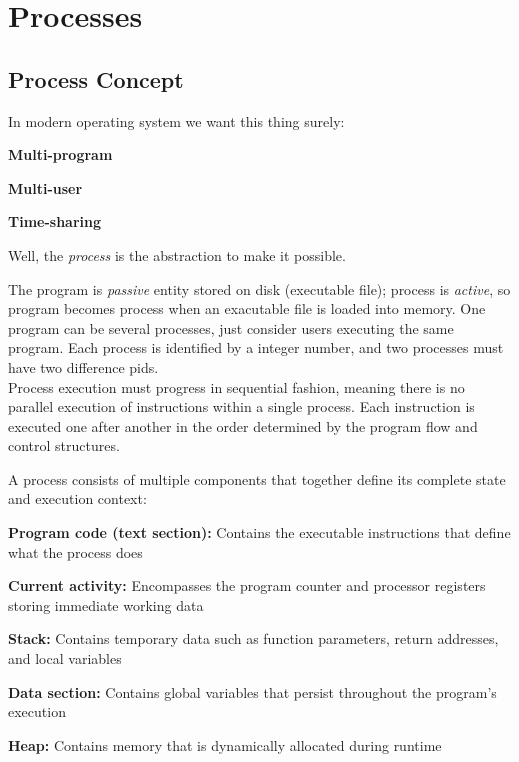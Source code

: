 \chapter{Processes}

\section{Process Concept}

    In modern operating system we want this thing surely:
    \begin{compactitemize}
        \item \textbf{Multi-program}
        \item \textbf{Multi-user}
        \item \textbf{Time-sharing}
    \end{compactitemize}
    Well, the \emph{process} is the abstraction to make it possible.
    
    The program is \emph{passive} entity stored on disk (executable file); process is \emph{active}, so program becomes process when an exacutable file is loaded into memory. One program can be several processes, just consider users executing the same program.
    Each process is identified by a integer number, and two processes must have two difference pids.\\
    
    Process execution must progress in sequential fashion, meaning there is no parallel execution of instructions within a single process. Each instruction is executed one after another in the order determined by the program flow and control structures.
    
    A process consists of multiple components that together define its complete state and execution context:
    \begin{compactitemize}
        \item \textbf{Program code (text section):} Contains the executable instructions that define what the process does
        \item \textbf{Current activity:} Encompasses the program counter and processor registers storing immediate working data
        \item \textbf{Stack:} Contains temporary data such as function parameters, return addresses, and local variables
        \item \textbf{Data section:} Contains global variables that persist throughout the program's execution
        \item \textbf{Heap:} Contains memory that is dynamically allocated during runtime
    \end{compactitemize}
 


